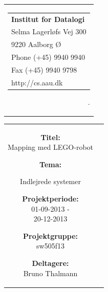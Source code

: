 \thispagestyle{empty}
\begin{titlepage}
\setlength{\textwidth}{15cm}
	\noindent
\begin{nopagebreak}
{\samepage 
\begin{tabular}{r}
	\parbox{15cm}{
	\hfill \parbox{7cm}{\begin{tabular}{l}
		{\small \textbf{Institut for Datalogi}}\\
		{\small Selma Lagerløfs Vej 300} \\
		{\small 9220 Aalborg Ø} \\
		{\small Phone (+45) 9940 9940} \\
		{\small Fax (+45) 9940 9798} \\
		{\small http://cs.aau.dk}
	\end{tabular}}
.	}
\end{tabular}

\begin{tabular}{cc}
	\parbox{8cm}{
	\begin{description}
		\item { \textbf{Titel:}}\\ 
			Mapping med LEGO-robot
    		\item { \textbf{Tema:}}\\ 
			\raggedright Indlejrede systemer
	\end{description}
	
	\parbox{8cm}{
	\begin{description}
		\item { \textbf{Projektperiode:}}\\
			01-09-2013 -\\
			20-12-2013
 		\hspace{4cm}
		\item { \textbf{Projektgruppe:}}\\
  			sw505f13
 		\hspace{4cm}
		\item {\textbf{Deltagere:}}\\
			Bruno Thalmann\\
		\hspace{2cm}
		

\end{description}}}
\end{tabular}}
\end{nopagebreak}
\end{titlepage}
